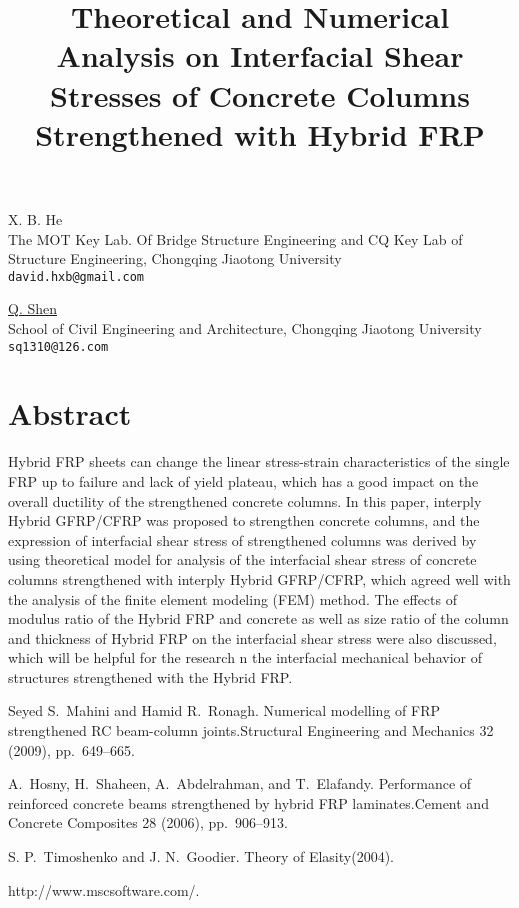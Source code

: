 \title{Theoretical and Numerical Analysis on Interfacial Shear Stresses of Concrete Columns Strengthened with Hybrid FRP}
\author{} \institute{}
\maketitle

\begin{center}
{\large X. B. He}\\
The MOT Key Lab. Of Bridge Structure Engineering and CQ Key Lab of Structure Engineering, Chongqing Jiaotong University\\
{\tt david.hxb@gmail.com}\\
\vspace{4mm}

{\large \underline{Q. Shen}}\\
School of Civil Engineering and Architecture, Chongqing Jiaotong University\\
{\tt sq1310@126.com}
\end{center}

\section*{Abstract}
Hybrid FRP sheets can change the linear stress-strain characteristics of the single FRP up to failure and lack of yield plateau, which has a good impact on the overall ductility of the strengthened concrete columns. In this paper, interply Hybrid GFRP/CFRP was proposed to strengthen concrete columns, and the expression of interfacial shear stress of strengthened columns was derived by using theoretical model for analysis of the interfacial shear stress of concrete columns strengthened with interply Hybrid GFRP/CFRP, which agreed well with the analysis of the finite element modeling (FEM) method. The effects of modulus ratio of the Hybrid FRP and concrete as well as size ratio of the column and thickness of Hybrid FRP on the interfacial shear stress were also discussed, which will be helpful for the research n the interfacial mechanical behavior of structures strengthened with the Hybrid FRP.


\begin{thebibliography}{10}
{\sc Seyed S.~Mahini and Hamid R.~Ronagh}. {Numerical modelling of FRP strengthened RC beam-column joints}.Structural Engineering and Mechanics 32 (2009), pp.~649--665.

{\sc A.~Hosny, H.~Shaheen, A.~Abdelrahman, and T.~Elafandy}. {Performance of reinforced concrete beams strengthened by hybrid FRP laminates}.Cement and Concrete Composites 28 (2006), pp.~906--913.

{\sc S. P.~Timoshenko and J. N.~Goodier}. {Theory of Elasity}(2004).

\newblock http://www.mscsoftware.com/.
\end{thebibliography}